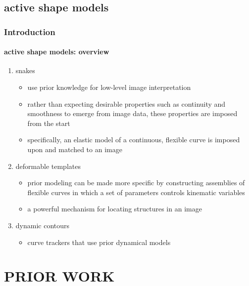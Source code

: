 \subsection{active shape models}
\begin{frame}
\frametitle{Introduction}
\framesubtitle{active shape models: overview}
\logoCSIPCPL\mypagenum
{}
	\begin{enumerate}\small
		\item {\color{red} snakes}
			\begin{itemize}\small
				\item use prior knowledge for low-level image interpretation
				\item rather than expecting desirable properties such as continuity and smoothness to emerge from image data, these properties are imposed from the start
				\item specifically, an {\color{blue}elastic model of a continuous, flexible curve} is imposed upon and matched to an image
			\end{itemize}
		\item {\color{red} deformable templates}
			\begin{itemize}\small
				\item prior modeling can be made more specific by constructing {\color{blue}assemblies of flexible curves} in which a set of parameters controls kinematic variables
				\item a powerful mechanism for locating structures in an image
			\end{itemize}
		\item {\color{red} dynamic contours}
			\begin{itemize}\small
				\item {\color{blue}curve trackers that use prior dynamical models}
			\end{itemize}
	\end{enumerate}
\end{frame}


\section{PRIOR WORK}



